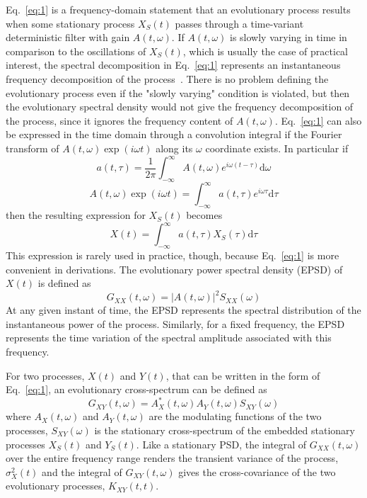 \documentclass{article}
\begin{document}
Eq.~\eqref{eq:1} is a frequency-domain statement that an evolutionary process
results when some stationary process $X_S (t)$ passes through a time-variant
deterministic filter with gain $A (t, \omega)$. If $A (t, \omega)$ is slowly
varying in time in comparison to the oscillations of $X_S (t)$, which is
usually the case of practical interest, the spectral decomposition in
Eq.~\eqref{eq:1} represents an instantaneous frequency decomposition of the
process~{\cite{Priestley1965}}. There is no problem defining the evolutionary
process even if the "slowly varying" condition is violated, but then the
evolutionary spectral density would not give the frequency decomposition of
the process, since it ignores the frequency content of $A (t, \omega)$.
Eq.~\eqref{eq:1} can also be expressed in the time domain through a
convolution integral if the Fourier transform of $A (t, \omega) \exp (i \omega
t)$ along its $\omega$ coordinate exists. In particular if
\begin{equation}
  a (t, \tau) = \frac{1}{2 \pi}  \int_{- \infty}^{\infty} A (t, \omega) e^{i
  \omega (t - \tau)} \mathrm{d} \omega
\end{equation}
\begin{equation}
  A (t, \omega) \exp (i \omega t) = \int_{- \infty}^{\infty} a (t, \tau) e^{i
  \omega \tau} \mathrm{d} \tau \label{eq:4}
\end{equation}
then the resulting expression for $X_S (t)$ becomes
\begin{equation}
  X (t) = \int_{- \infty}^{\infty} a (t, \tau) X_S (\tau) \mathrm{d} \tau
  \label{eq:5}
\end{equation}
This expression is rarely used in practice, though, because Eq.~\eqref{eq:1}
is more convenient in derivations. The evolutionary power spectral density
(EPSD) of $X (t)$ is defined as
\begin{equation}
  G_{XX} (t, \omega) = |A (t, \omega) |^2 S_{XX} (\omega) \label{eq:6}
\end{equation}
At any given instant of time, the EPSD represents the spectral distribution of
the instantaneous power of the process. Similarly, for a fixed frequency, the
EPSD represents the time variation of the spectral amplitude associated with
this frequency.

For two processes, $X (t)$ and $Y (t)$, that can be written in the form of
Eq.~\eqref{eq:1}, an evolutionary cross-spectrum can be defined as
\begin{equation}
  G_{XY} (t, \omega) = A_X^{\ast} (t, \omega) A_Y (t, \omega) S_{XY} (\omega)
  \label{eq:7}
\end{equation}
where $A_X (t, \omega)$ and $A_Y (t, \omega)$ are the modulating functions of
the two processes, $S_{XY} (\omega)$ is the stationary cross-spectrum of the
embedded stationary processes $X_S (t)$ and $Y_S (t)$. Like a stationary PSD,
the integral of $G_{XX} (t, \omega)$ over the entire frequency range renders
the transient variance of the process, $\sigma_X^2 (t)$ and the integral of
$G_{XY} (t, \omega)$ gives the cross-covariance of the two evolutionary
processes, $K_{XY} (t, t)$.
\end{document}
